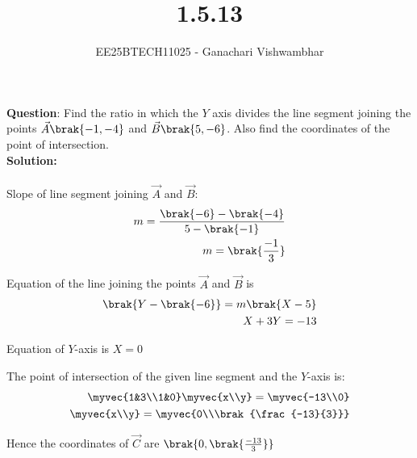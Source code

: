 \documentclass[journal]{IEEEtran}
\begin{document}


\title{1.5.13}
\author{EE25BTECH11025 - Ganachari Vishwambhar}

{\let\newpage\relax\maketitle}

\renewcommand{\thefigure}{\theenumi}
\renewcommand{\thetable}{\theenumi}
\setlength{\intextsep}{10pt}


\renewcommand{\thetable}{\theenumi}

\textbf{Question}:\newline
Find the ratio in which the $Y$ axis divides the line segment joining the points $\vec{A}\brak{-1,-4}$ and $\vec{B}\brak{5,-6}$. Also find the coordinates of the point of intersection.\\
\textbf{Solution: }\\

\\

Slope of line segment joining $\vec{A}$ and $\vec{B}$:\\
\begin{align}
m=\frac{\brak{-6}-\brak{-4}}{5-\brak{-1}}\\
m=\brak{\frac{-1}{3}}
\end{align}

Equation of the line joining the points $\vec{A}$ and $\vec{B}$ is\\
\begin{align}
\brak{Y-\brak{-6}}=m\brak{X-5}\\
X+3Y=-13
\end{align}

Equation of $Y$-axis is $X=0$

The point of intersection of the given line segment and the $Y$-axis is:\\
\begin{align}
\myvec{1&3\\1&0}\myvec{x\\y}=\myvec{-13\\0}\\
\myvec{x\\y}=\myvec{0\\\brak{\frac{-13}{3}}}
\end{align}

Hence the coordinates of $\vec{C}$ are $\brak{0,\brak{\frac{-13}{3}}}$
\end{document}
